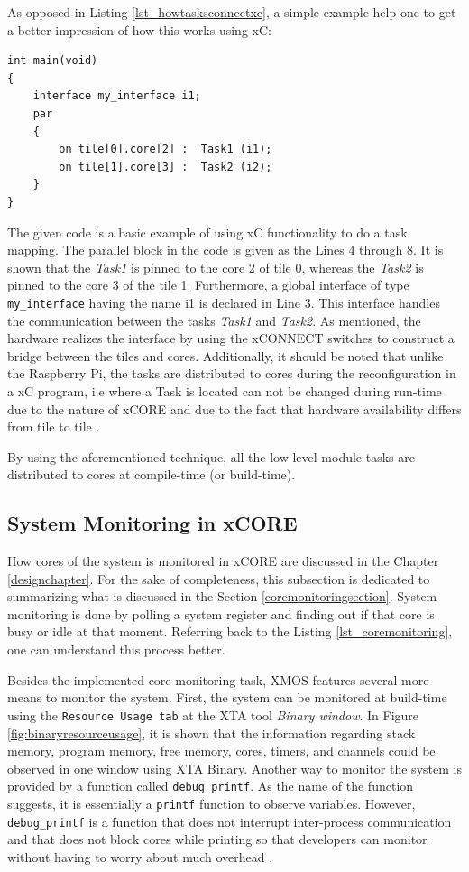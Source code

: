 As opposed in Listing \ref{lst_howtasksconnectxc}, a simple example help one to get a better impression of how this works using xC:

\begin{lstlisting}[style=xc]
int main(void)
{
	interface my_interface i1;
	par
	{
		on tile[0].core[2] :  Task1 (i1);
		on tile[1].core[3] :  Task2 (i2);
	}
}
\end{lstlisting}

The given code is a basic example of using xC functionality to do a task mapping. The parallel block in the code is given as the Lines 4 through 8. It is shown that the \textit{Task1} is pinned to the core 2 of tile 0, whereas the \textit{Task2} is pinned to the core 3 of the tile 1. Furthermore, a global interface of type \texttt{my\texttt{\_}interface} having the name i1 is declared in Line 3. This interface handles the communication between the tasks \textit{Task1} and \textit{Task2}. As mentioned, the hardware realizes the interface by using the xCONNECT switches to construct a bridge between the tiles and cores. Additionally, it should be noted that unlike the Raspberry Pi, the tasks are distributed to cores during the reconfiguration in a xC program, i.e where a Task is located can not be changed during run-time due to the nature of xCORE and due to the fact that hardware availability differs from tile to tile \cite{xmosprogrguide}.

By using the aforementioned technique, all the low-level module tasks are distributed to cores at compile-time (or build-time). 

\subsection{System Monitoring in xCORE}
How cores of the system is monitored in xCORE are discussed in the Chapter \ref{designchapter}. For the sake of completeness, this subsection is dedicated to summarizing what is discussed in the Section \ref{coremonitoringsection}. System monitoring is done by polling a system register and finding out if that core is busy or idle at that moment. Referring back to the Listing  \ref{lst_coremonitoring}, one can understand this process better.

Besides the implemented core monitoring task, XMOS features several more means to monitor the system. First, the system can be monitored at build-time using the \texttt{Resource Usage tab} at the XTA tool \textit{Binary window}. In Figure \ref{fig:binaryresourceusage}, it is shown that the information regarding stack memory, program memory, free memory, cores, timers, and channels could be observed in one window using XTA Binary. Another way to monitor the system is provided by a function called \texttt{debug\texttt{\_}printf}. As the name of the function suggests, it is essentially a \texttt{printf} function to observe variables. However, \texttt{debug\texttt{\_}printf} is a function that does not interrupt inter-process communication and that does not block cores while printing so that developers can monitor without having to worry about much overhead \cite{xmosprogrguide}.

